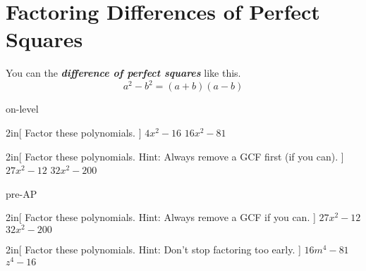 
\section{Factoring Differences of Perfect Squares}

\begin{myCenteredBox}[width=4.75in,]
    You can  the {\bfseries\itshape difference of perfect squares} like this.
    \Large
    \begin{equation*}
        a^2 - b^2 = (a+b)(a-b)
    \end{equation*}
\end{myCenteredBox}

\begin{taggedblock}{on-level}
    \begin{my2Problems}[\large]{2in}[
        Factor these polynomials.
        ]
        {
            $ 4x^2 - 16 $
        }
        {
            $ 16x^2 - 81 $
        }
    \end{my2Problems}

    \begin{my2Problems}[\large]{2in}[
        Factor these polynomials. Hint: Always remove a GCF first (if you can).
        ]
        {
            $ 27x^2 - 12 $
        }
        {
            $ 32x^2 - 200 $
        }
    \end{my2Problems}
\end{taggedblock}


\begin{taggedblock}{pre-AP}
    \begin{my2Problems}[\large]{2in}[
        Factor these polynomials. Hint: Always remove a GCF if you can.
        ]
        {
            $ 27x^2 - 12 $
        }
        {
            $ 32x^2 - 200 $
        }
    \end{my2Problems}

    \begin{my2Problems}[\large]{2in}[
        Factor these polynomials. Hint: Don't stop factoring too early.
        ]
        {
            $ 16m^4 - 81 $
        }
        {
            $ z^4 - 16 $
        }
    \end{my2Problems}
\end{taggedblock}

